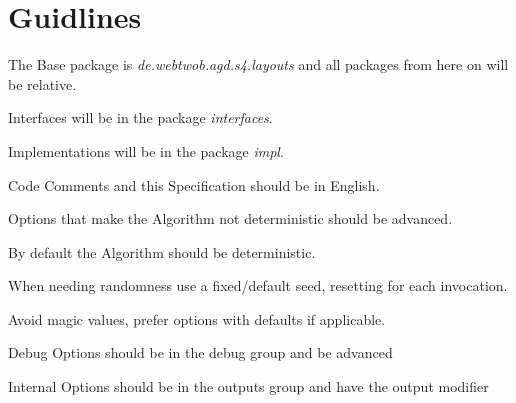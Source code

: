 \section{Guidlines}

\begin{list}{-}{}
\item The Base package is \textit{de.webtwob.agd.s4.layouts} and all packages from here on will be relative.
\item Interfaces will be in the package \textit{interfaces}.
\item Implementations will be in the package \textit{impl}.
\item Code Comments and this Specification should be in English.
\item Options that make the Algorithm not deterministic should be advanced.
\item By default the Algorithm should be deterministic.
\item When needing randomness use a fixed/default seed, resetting for each invocation.
\item Avoid magic values, prefer options with defaults if applicable.
\item Debug Options should be in the debug group and be advanced
\item Internal Options should be in the outputs group and have the output modifier
\end{list}
